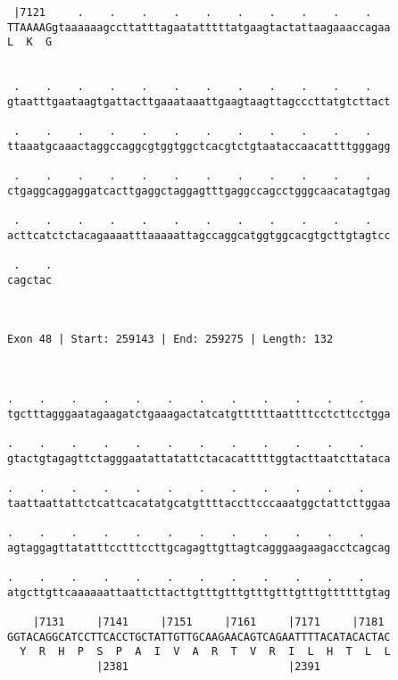 \documentclass{article}
\begin{document}
\begin{Verbatim}
 |7121     .    .    .    .    .    .    .    .    .    .   
TTAAAAGgtaaaaaagccttatttagaatatttttatgaagtactattaagaaaccagaa
L  K  G                                                     
                                                            
  
 .    .    .    .    .    .    .    .    .    .    .    .   
gtaatttgaataagtgattacttgaaataaattgaagtaagttagcccttatgtcttact
                                                            
 .    .    .    .    .    .    .    .    .    .    .    .   
ttaaatgcaaactaggccaggcgtggtggctcacgtctgtaataccaacattttgggagg
                                                            
 .    .    .    .    .    .    .    .    .    .    .    .   
ctgaggcaggaggatcacttgaggctaggagtttgaggccagcctgggcaacatagtgag
                                                            
 .    .    .    .    .    .    .    .    .    .    .    .   
acttcatctctacagaaaatttaaaaattagccaggcatggtggcacgtgcttgtagtcc
                                                            
 .    .
cagctac
       
       
 
Exon 48 | Start: 259143 | End: 259275 | Length: 132



.    .    .    .    .    .    .    .    .    .    .    .    
tgctttagggaatagaagatctgaaagactatcatgttttttaattttcctcttcctgga
                                                            
.    .    .    .    .    .    .    .    .    .    .    .    
gtactgtagagttctagggaatattatattctacacatttttggtacttaatcttataca
                                                            
.    .    .    .    .    .    .    .    .    .    .    .    
taattaattattctcattcacatatgcatgttttaccttcccaaatggctattcttggaa
                                                            
.    .    .    .    .    .    .    .    .    .    .    .    
agtaggagttatatttcctttccttgcagagttgttagtcagggaagaagacctcagcag
                                                            
.    .    .    .    .    .    .    .    .    .    .    .    
atgcttgttcaaaaaattaattcttacttgtttgtttgtttgtttgtttgttttttgtag
                                                            
    |7131     |7141     |7151     |7161     |7171     |7181 
GGTACAGGCATCCTTCACCTGCTATTGTTGCAAGAACAGTCAGAATTTTACATACACTAC
  Y  R  H  P  S  P  A  I  V  A  R  T  V  R  I  L  H  T  L  L
              |2381                         |2391           
  

\end{Verbatim}
\end{document}
